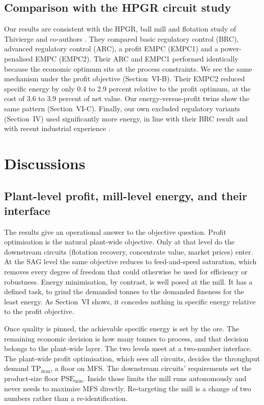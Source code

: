 \documentclass[conference]{IEEEtran}
\begin{document}
\subsection{Comparison with the HPGR circuit study}

Our results are consistent with the HPGR, ball mill and flotation study
of Thivierge and co-authors \cite{thivierge2023}. They compared basic
regulatory control (BRC), advanced regulatory control (ARC), a profit
EMPC (EMPC1) and a power-penalised EMPC (EMPC2). Their ARC and EMPC1
performed identically because the economic optimum sits at the process
constraints. We see the same mechanism under the profit objective
(Section~VI-B). Their EMPC2 reduced specific energy by only 0.4
to 2.9 percent relative to the profit optimum, at the cost of 3.6 to
3.9 percent of net value. Our energy-versus-profit twins show the same
pattern (Section~VI-C). Finally, our own excluded regulatory variants
(Section~IV) used significantly more energy, in line with their BRC
result and with recent industrial experience \cite{costa2025}.

\section{Discussions}

\subsection{Plant-level profit, mill-level energy, and their interface}

The results give an operational answer to the objective question. Profit
optimisation is the natural plant-wide objective. Only at that level do
the downstream circuits (flotation recovery, concentrate value, market
prices) enter. At the SAG level the same objective reduces to
feed-and-speed saturation, which removes every degree of freedom that
could otherwise be used for efficiency or robustness. Energy
minimisation, by contrast, is well posed at the mill. It has a defined
task, to grind the demanded tonnes to the demanded fineness for the
least energy. As Section~VI shows, it concedes nothing in specific
energy relative to the profit objective.

Once quality is pinned, the achievable specific energy is set by the
ore. The remaining economic decision is how many tonnes to process, and
that decision belongs to the plant-wide layer. The two levels meet at a
two-number interface. The plant-wide profit optimisation, which sees
all circuits, decides the throughput demand
$\mathrm{TP}_{\mathrm{dem}}$, a floor on MFS. The downstream circuits'
requirements set the product-size floor $\mathrm{PSE}_{\min}$. Inside
those limits the mill runs autonomously and never needs to maximise MFS
directly. Re-targeting the mill is a change of two numbers rather than
a re-identification.
\end{document}
